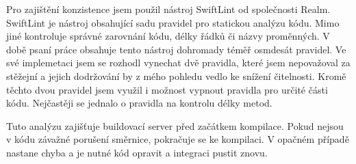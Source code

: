 Pro zajištění konzistence jsem použil nástroj SwiftLint od společnosti Realm.
SwiftLint je nástroj obsahující sadu pravidel pro statickou analýzu kódu.
Mimo jiné kontroluje správné zarovnání kódu, délky řádků či názvy proměnných.
V době psaní práce obsahuje tento nástroj dohromady téměř osmdesát pravidel.
Ve své implemetaci jsem se rozhodl vynechat dvě pravidla, které jsem nepovažoval za stěžejní a jejich dodržování by z mého pohledu vedlo ke snížení čitelnosti.
Kromě těchto dvou pravidel jsem využil i možnost vypnout pravidla pro určité části kódu.
Nejčastěji se jednalo o pravidla na kontrolu délky metod.

Tuto analýzu zajišťuje buildovací server před začátkem kompilace.
Pokud nejsou v kódu závažné porušení směrnice, pokračuje se ke kompilaci.
V opačném případě nastane chyba a je nutné kód opravit a integraci pustit znovu.
